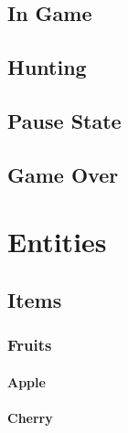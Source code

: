 \documentclass{report}
\begin{document}
  \section{In Game} %
  \label{sec:in_game}


  \section{Hunting} %
  \label{sec:hunting}


  \section{Pause State} %
  \label{sec:pause_state}


  \section{Game Over} %
  \label{sec:game_over}


\chapter{Entities} %
\label{cha:entities}

  \section{Items} %
  \label{sec:items}

    \subsection{Fruits} %
    \label{sub:fruits}

      \subsubsection{Apple} %
      \label{ssub:apple}


      \subsubsection{Cherry} %
      \label{ssub:cherry}
\end{document}

